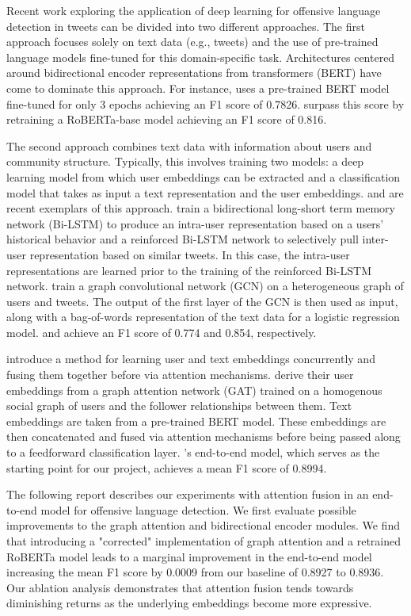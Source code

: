 \documentclass[letterpaper]{article} %
\begin{document}
Recent work exploring the application of deep learning for offensive language detection in tweets can be divided into two different approaches. The first approach focuses solely on text data (e.g., tweets) and the use of pre-trained language models fine-tuned for this domain-specific task. Architectures centered around bidirectional encoder representations from transformers (BERT) have come to dominate this approach. For instance, \citet{liu2019-nuli} uses a pre-trained BERT model fine-tuned for only 3 epochs achieving an F1 score of 0.7826. \citet{Barbieri2020} surpass this score by retraining a RoBERTa-base model achieving an F1 score of 0.816.

The second approach combines text data with information about users and community structure. Typically, this involves training two models: a deep learning model from which user embeddings can be extracted and a classification model that takes as input a text representation and the user embeddings. \citet{qian-etal-2018-leveraging} and \citet{Mishra2019} are recent exemplars of this approach. \citet{qian-etal-2018-leveraging} train a bidirectional long-short term memory network (Bi-LSTM) to produce an intra-user representation based on a users' historical behavior and a reinforced Bi-LSTM network to selectively pull inter-user representation based on similar tweets. In this case, the intra-user representations are learned prior to the training of the reinforced Bi-LSTM network. \citet{Mishra2019} train a graph convolutional network (GCN) on a heterogeneous graph of users and tweets. The output of the first layer of the GCN is then used as input, along with a bag-of-words representation of the text data for a logistic regression model. \citet{qian-etal-2018-leveraging} and \citet{Mishra2019} achieve an F1 score of 0.774 and 0.854, respectively.

\citet{Miao2022} introduce a method for learning user and text embeddings concurrently and fusing them together before via attention mechanisms. \citet{Miao2022} derive their user embeddings from a graph attention network (GAT) trained on a homogenous social graph of users and the follower relationships between them. Text embeddings are taken from a pre-trained BERT model. These embeddings are then concatenated and fused via attention mechanisms before being passed along to a feedforward classification layer. \citet{Miao2022}'s end-to-end model, which serves as the starting point for our project, achieves a mean F1 score of 0.8994.

The following report describes our experiments with attention fusion in an end-to-end model for offensive language detection. We first evaluate possible improvements to the graph attention and bidirectional encoder modules. We find that introducing a "corrected" implementation of graph attention and a retrained RoBERTa model leads to a marginal improvement in the end-to-end model increasing the mean F1 score by 0.0009 from our baseline of 0.8927 to 0.8936. Our ablation analysis demonstrates that attention fusion tends towards diminishing returns as the underlying embeddings become more expressive.
\end{document}
